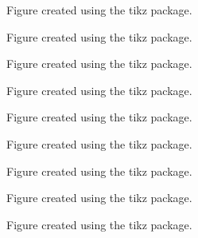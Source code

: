 \begin{figure}[htbp]
  \centering
  \caption{Figure created using the tikz package.}
\end{figure}
\begin{figure}[htbp]
  \centering
  \caption{Figure created using the tikz package.}
\end{figure}
\begin{figure}[htbp]
  \centering
  \caption{Figure created using the tikz package.}
\end{figure}
\begin{figure}[htbp]
  \centering
  \caption{Figure created using the tikz package.}
\end{figure}
\begin{figure}[htbp]
  \centering
  \caption{Figure created using the tikz package.}
\end{figure}
\begin{figure}[htbp]
  \centering
  \caption{Figure created using the tikz package.}
\end{figure}
\clearpage
\begin{figure}[htbp]
  \centering
  \caption{Figure created using the tikz package.}
\end{figure}
\begin{figure}[htbp]
  \centering
  \caption{Figure created using the tikz package.}
\end{figure}
\begin{figure}[htbp]
  \centering
  \caption{Figure created using the tikz package.}
\end{figure}